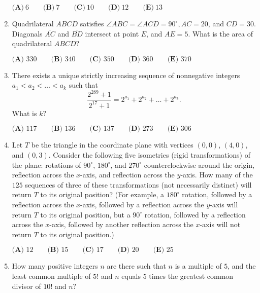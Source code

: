 \documentclass{article}
\begin{document}
\begin{enumerate}[label=\arabic*., itemsep=0.5em]
\(\textbf{(A)}\ 6\qquad\textbf{(B)}\ 7\qquad\textbf{(C)}\ 10\qquad\textbf{(D)}\ 12\qquad\textbf{(E)}\ 13\)\par \vspace{0.5em}\item Quadrilateral \(ABCD\) satisfies \(\angle ABC = \angle ACD = 90^{\circ}, AC = 20\), and \(CD = 30\). Diagonals \(\overline{AC}\) and \(\overline{BD}\) intersect at point \(E\), and \(AE = 5\). What is the area of quadrilateral \(ABCD\)?

\(\textbf{(A) } 330 \qquad\textbf{(B) } 340 \qquad\textbf{(C) } 350 \qquad\textbf{(D) } 360 \qquad\textbf{(E) } 370\)\par \vspace{0.5em}\item There exists a unique strictly increasing sequence of nonnegative integers \(a_1 < a_2 < … < a_k\) such that
\begin{equation*}
\frac{2^{289}+1}{2^{17}+1} = 2^{a_1} + 2^{a_2} + … + 2^{a_k}.
\end{equation*}
What is \(k?\)

\(\textbf{(A) } 117 \qquad \textbf{(B) } 136 \qquad \textbf{(C) } 137 \qquad \textbf{(D) } 273 \qquad \textbf{(E) } 306\)\par \vspace{0.5em}\item Let \(T\) be the triangle in the coordinate plane with vertices \(\left(0,0\right)\), \(\left(4,0\right)\), and \(\left(0,3\right)\). Consider the following five isometries (rigid transformations) of the plane: rotations of \(90^{\circ}\), \(180^{\circ}\), and \(270^{\circ}\) counterclockwise around the origin, reflection across the \(x\)-axis, and reflection across the \(y\)-axis. How many of the \(125\) sequences of three of these transformations (not necessarily distinct) will return \(T\) to its original position? (For example, a \(180^{\circ}\) rotation, followed by a reflection across the \(x\)-axis, followed by a reflection across the \(y\)-axis will return \(T\) to its original position, but a \(90^{\circ}\) rotation, followed by a reflection across the \(x\)-axis, followed by another reflection across the \(x\)-axis will not return \(T\) to its original position.)

\(\textbf{(A) } 12\qquad\textbf{(B) } 15\qquad\textbf{(C) }17 \qquad\textbf{(D) }20 \qquad\textbf{(E) }25\)\par \vspace{0.5em}\item How many positive integers \(n\) are there such that \(n\) is a multiple of \(5\), and the least common multiple of \(5!\) and \(n\) equals \(5\) times the greatest common divisor of \(10!\) and \(n?\)


\end{enumerate}
\end{document}
